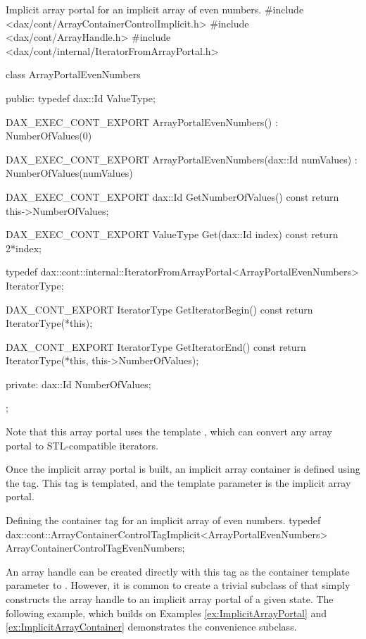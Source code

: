 \begin{daxexample}[ex:ImplicitArrayPortal]{Implicit array portal for an implicit array of even numbers.}
#include <dax/cont/ArrayContainerControlImplicit.h>
#include <dax/cont/ArrayHandle.h>
#include <dax/cont/internal/IteratorFromArrayPortal.h>

class ArrayPortalEvenNumbers
{
public:
  typedef dax::Id ValueType;

  DAX_EXEC_CONT_EXPORT
  ArrayPortalEvenNumbers() : NumberOfValues(0) {  }

  DAX_EXEC_CONT_EXPORT
  ArrayPortalEvenNumbers(dax::Id numValues) : NumberOfValues(numValues) {  }

  DAX_EXEC_CONT_EXPORT
  dax::Id GetNumberOfValues() const { return this->NumberOfValues; }

  DAX_EXEC_CONT_EXPORT
  ValueType Get(dax::Id index) const { return 2*index; }

  typedef dax::cont::internal::IteratorFromArrayPortal<ArrayPortalEvenNumbers> IteratorType;

  DAX_CONT_EXPORT
  IteratorType GetIteratorBegin() const
  {
    return IteratorType(*this);
  }

  DAX_CONT_EXPORT
  IteratorType GetIteratorEnd() const
  {
    return IteratorType(*this, this->NumberOfValues);
  }

private:
  dax::Id NumberOfValues;
};
\end{daxexample}

Note that this array portal uses the template
, which can convert any array
portal to STL-compatible iterators.

Once the implicit array portal is built, an implicit array container is
defined using the  tag. This tag
is templated, and the template parameter is the implicit array portal.

\begin{daxexample}[ex:ImplicitArrayContainer]{Defining the container tag for an implicit array of even numbers.}
typedef dax::cont::ArrayContainerControlTagImplicit<ArrayPortalEvenNumbers>
    ArrayContainerControlTagEvenNumbers;
\end{daxexample}

An array handle can be created directly with this tag as the container
template parameter to . However, it is common to
create a trivial subclass of  that simply constructs
the array handle to an implicit array portal of a given state.  The
following example, which builds on Examples \ref{ex:ImplicitArrayPortal}
and \ref{ex:ImplicitArrayContainer} demonstrates the convenience
 subclass.

